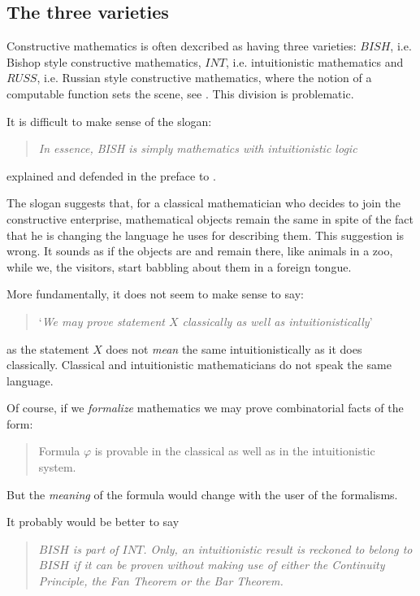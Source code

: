 \documentclass[a4paper]{amsart}
\theoremstyle{plain}
\begin{document}
\subsection{The three varieties} Constructive mathematics is often dexcribed as having three varieties: $BISH$, i.e. Bishop style constructive mathematics, $INT$, i.e. intuitionistic mathematics and $RUSS$, i.e. Russian style constructive mathematics, where the notion of a computable function sets the scene, see \cite{bridgesrichman87}. This division is problematic.
 
 It is  difficult to make sense of the slogan: \begin{quote} {\it In essence, BISH is simply mathematics with intuitionistic logic} \end{quote}
 
 explained and defended in the preface to \cite{bridgesvita06}.

The slogan suggests that, for a classical mathematician who decides to join the constructive enterprise, mathematical objects remain the same in spite of the fact that he is changing  the language he uses for describing them. This suggestion is wrong. It sounds as if the objects are and remain there, like animals in a zoo, while we, the visitors, start  babbling about them in a foreign tongue.  


More fundamentally, it does not seem to make sense to say: \begin{quote} `{\it We may prove statement $X$ classically as well as intuitionistically}' \end{quote}
 
 as the statement $X$ does not {\it mean} the same intuitionistically as it does classically. Classical and intuitionistic mathematicians do not speak the same language. 
 
 Of course, if we {\it formalize} mathematics we may prove combinatorial facts of the form:\begin{quote} Formula $\varphi$ is provable in the classical as well as in the intuitionistic system. \end{quote}
 
 But the {\it meaning} of the formula would change with the user of the formalisms. 
 
 It probably would be better to say\begin{quote} {\it $BISH$ is part of $INT$. Only, an intuitionistic  result is reckoned to belong to $BISH$ if it can be proven without making use of either the Continuity Principle, the Fan Theorem or the Bar Theorem.} \end{quote}
 
\end{document}
